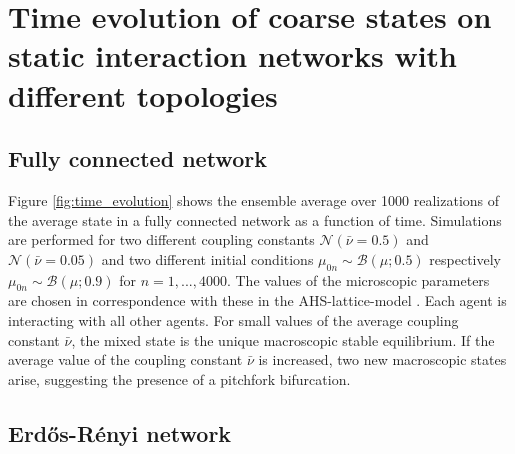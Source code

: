 \documentclass[]{article}
\title{}
\author{}
\begin{document}







\section{Time evolution of coarse states on static interaction networks with different topologies}
\subsection{Fully connected network}

Figure \ref{fig:time_evolution} shows the ensemble average over 1000 realizations of the average state in a fully connected network as a function of time. Simulations are performed for two different coupling constants $\mathcal{N}(\bar{\nu}=0.5)$ and  $\mathcal{N}(\bar{\nu}=0.05)$ and two different initial conditions $ \mu_{0 n} \sim \mathcal{B} ( \mu; 0.5) $ respectively $ \mu_{0n} \sim\mathcal{B} ( \mu; 0.9 ) $ for $n=1,...,4000$.     %
 The values of the microscopic parameters are chosen in correspondence with these in the AHS-lattice-model \cite{avitabile14}. Each agent is interacting with all other agents. For small values of the average coupling constant $\bar{\nu}$, the mixed state is the unique macroscopic stable equilibrium.  If the average value of the coupling constant $\bar{\nu}$ is increased, two new macroscopic states arise, suggesting the presence of a pitchfork bifurcation. 

\subsection{Erd\H{o}s-Rényi network}
\end{document}
